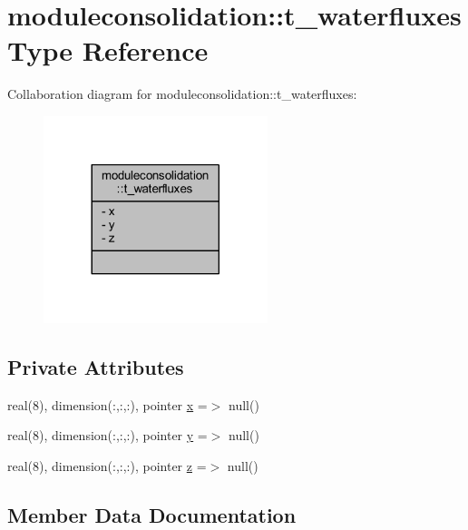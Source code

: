\hypertarget{structmoduleconsolidation_1_1t__waterfluxes}{}\section{moduleconsolidation\+:\+:t\+\_\+waterfluxes Type Reference}
\label{structmoduleconsolidation_1_1t__waterfluxes}


Collaboration diagram for moduleconsolidation\+:\+:t\+\_\+waterfluxes\+:\nopagebreak
\begin{figure}[H]
\begin{center}
\leavevmode
\includegraphics[width=185pt]{structmoduleconsolidation_1_1t__waterfluxes__coll__graph}
\end{center}
\end{figure}
\subsection*{Private Attributes}
\begin{DoxyCompactItemize}
\item 
real(8), dimension(\+:,\+:,\+:), pointer \mbox{\hyperlink{structmoduleconsolidation_1_1t__waterfluxes_a64e495cb538fead5a4e22cbc24faad5f}{x}} =$>$ null()
\item 
real(8), dimension(\+:,\+:,\+:), pointer \mbox{\hyperlink{structmoduleconsolidation_1_1t__waterfluxes_a72d7a0ac73918ace4b4a2f318bb1d6df}{y}} =$>$ null()
\item 
real(8), dimension(\+:,\+:,\+:), pointer \mbox{\hyperlink{structmoduleconsolidation_1_1t__waterfluxes_ab9a2d284ea231db0347ffc8d12167826}{z}} =$>$ null()
\end{DoxyCompactItemize}


\subsection{Member Data Documentation}
\mbox{\label{structmoduleconsolidation_1_1t__waterfluxes_a64e495cb538fead5a4e22cbc24faad5f}} 
